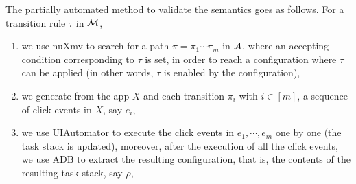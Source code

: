 The partially automated method to validate the semantics goes as follows. For a transition rule $\tau$ in ${\mathcal{M} }$,  
\begin{enumerate}
\item we use nuXmv to search for a path $\pi = \pi_1 \cdots \pi_m$ in ${\mathcal{A} }$, where an accepting condition corresponding to $\tau$ is set, in order to reach a configuration where $\tau$ can be applied (in other words, $\tau$ is enabled by the configuration), 
%
\item we generate from the app $X$ and each transition $\pi_i$ with $i \in [m]$, a sequence of click events in $X$, say $e_i$,
%
\item we use UIAutomator to execute the click events in $e_1, \cdots, e_m$ one by one (the task stack is updated), moreover, after the execution of all the click events, we use ADB to extract the resulting configuration, that is, the contents of the resulting task stack, say $\rho$,  


\end{enumerate}

